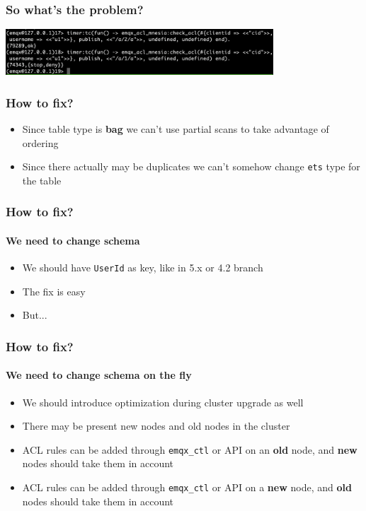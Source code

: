 \documentclass{beamer}
\begin{document}
\begin{frame}
    \frametitle{So what's the problem?}

    \begin{center}
        \includegraphics[width=10cm, keepaspectratio]{images/old-lookup-code-tc.png}
    \end{center}
\end{frame}

\begin{frame}
    \frametitle{How to fix?}

    \begin{itemize}
        \item Since table type is \textbf{bag} we can't use partial scans to take advantage of ordering
        \item Since there actually may be duplicates we can't somehow change \lstinline{ets} type for the table
    \end{itemize}
\end{frame}

\begin{frame}
    \frametitle{How to fix?}
    \framesubtitle{We need to change schema}

    \begin{itemize}
        \item We should have \lstinline{UserId} as key, like in 5.x or 4.2 branch
        \item The fix is easy
        \item But...
    \end{itemize}
\end{frame}

\begin{frame}
    \frametitle{How to fix?}
    \framesubtitle{We need to change schema on the fly}

    \begin{itemize}
        \item We should introduce optimization during cluster upgrade as well
        \item There may be present new nodes and old nodes in the cluster
        \item ACL rules can be added through \lstinline{emqx_ctl} or API on an \textbf{old} node, and \textbf{new}
        nodes should take them in account
        \item ACL rules can be added through \lstinline{emqx_ctl} or API on a \textbf{new} node, and \textbf{old}
        nodes should take them in account
    \end{itemize}
\end{frame}
\end{document}
